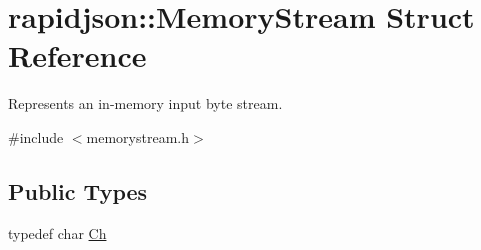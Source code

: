 \hypertarget{structrapidjson_1_1_memory_stream}{}\section{rapidjson\+::Memory\+Stream Struct Reference}
\label{structrapidjson_1_1_memory_stream}


Represents an in-\/memory input byte stream.  




{\ttfamily \#include $<$memorystream.\+h$>$}

\subsection*{Public Types}
\begin{DoxyCompactItemize}
\item 
typedef char \mbox{\hyperlink{structrapidjson_1_1_memory_stream_abf9f7cf51a5830ae45e24f5d55fdceaf}{Ch}}
\end{DoxyCompactItemize}
